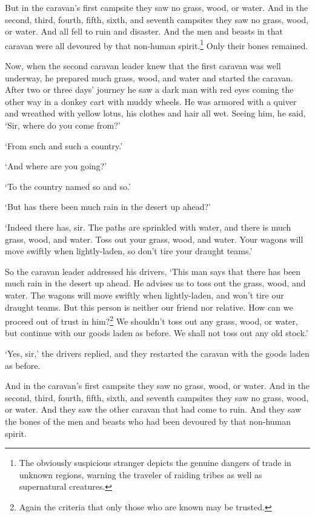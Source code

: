 \documentclass[12pt,openany]{book}%
\begin{document}
But in the caravan’s first campsite they saw no grass, wood, or water. And in the second, third, fourth, fifth, sixth, and seventh campsites they saw no grass, wood, or water. And all fell to ruin and disaster. And the men and beasts in that caravan were all devoured by that non-human spirit.\footnote{The obviously suspicious stranger depicts the genuine dangers of trade in unknown regions, warning the traveler of raiding tribes as well as supernatural creatures. } Only their bones remained. 

Now, when the second caravan leader knew that the first caravan was well underway, he prepared much grass, wood, and water and started the caravan. After two or three days’ journey he saw a dark man with red eyes coming the other way in a donkey cart with muddy wheels. He was armored with a quiver and wreathed with yellow lotus, his clothes and hair all wet. Seeing him, he said, ‘Sir, where do you come from?’ 

‘From such and such a country.’ 

‘And where are you going?’ 

‘To the country named so and so.’ 

‘But has there been much rain in the desert up ahead?’ 

‘Indeed there has, sir. The paths are sprinkled with water, and there is much grass, wood, and water. Toss out your grass, wood, and water. Your wagons will move swiftly when lightly-laden, so don’t tire your draught teams.’ 

So the caravan leader addressed his drivers, ‘This man says that there has been much rain in the desert up ahead. He advises us to toss out the grass, wood, and water. The wagons will move swiftly when lightly-laden, and won’t tire our draught teams. But this person is neither our friend nor relative. How can we proceed out of trust in him?\footnote{Again the criteria that only those who are known may be trusted. } We shouldn’t toss out any grass, wood, or water, but continue with our goods laden as before. We shall not toss out any old stock.’ 

‘Yes, sir,’ the drivers replied, and they restarted the caravan with the goods laden as before. 

And in the caravan’s first campsite they saw no grass, wood, or water. And in the second, third, fourth, fifth, sixth, and seventh campsites they saw no grass, wood, or water. And they saw the other caravan that had come to ruin. And they saw the bones of the men and beasts who had been devoured by that non-human spirit. 
\end{document}

